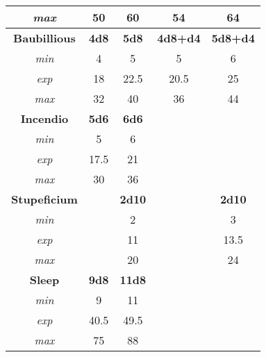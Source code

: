 \begin{tabular}{|c|cc|cc|}
	\textit{max}           &         50          &                60     &           54      &                  64      \\ \hline
	\textbf{Baubillious}   & \textbf{4d8}        & \textbf{5d8}          & \textbf{4d8+d4}   & \textbf{5d8+d4}          \\
	\textit{min}           &          4          &                 5     &            5      &     6                    \\
	\textit{exp}           &         18          &                22.5   &           20.5    &    25                    \\
	\textit{max}           &         32          &                40     &           36      &    44                    \\ \hline
	\textbf{Incendio}      & \textbf{5d6}        & \textbf{6d6}          &                   &                          \\
	\textit{min}           &          5          &                 6     &                   &                          \\
	\textit{exp}           &         17.5        &                21     &                   &                          \\
	\textit{max}           &         30          &                36     &                   &                          \\ \hline
	\textbf{Stupeficium}   &                     & \textbf{2d10}         &                   & \textbf{2d10}            \\
	\textit{min}           &                     &                    2  &                   &       3                  \\
	\textit{exp}           &                     &                   11  &                   &      13.5                \\
	\textit{max}           &                     &                   20  &                   &      24                  \\ \hline
	\textbf{Sleep}         & \textbf{9d8}        & \textbf{11d8}         &                   &                          \\
	\textit{min}           &          9          &                11     &                   &                          \\
	\textit{exp}           &         40.5        &                49.5   &                   &                          \\
	\textit{max}           &         75          &                88     &                   &                          \\ \hline
\end{tabular}\\


